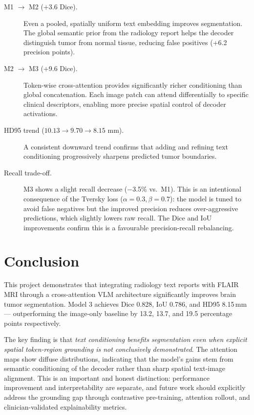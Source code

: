 \documentclass[12pt,a4paper]{article}
\begin{document}
\begin{description}
  \item[M1 $\to$ M2 ($+$3.6 Dice).]
    Even a pooled, spatially uniform text embedding improves segmentation.
    The global semantic prior from the radiology report helps the decoder
    distinguish tumor from normal tissue, reducing false positives (+6.2
    precision points).

  \item[M2 $\to$ M3 ($+$9.6 Dice).]
    Token-wise cross-attention provides significantly richer conditioning
    than global concatenation. Each image patch can attend differentially
    to specific clinical descriptors, enabling more precise spatial control
    of decoder activations.

  \item[HD95 trend ($10.13 \to 9.70 \to 8.15$ mm).]
    A consistent downward trend confirms that adding and refining text
    conditioning progressively sharpens predicted tumor boundaries.

  \item[Recall trade-off.]
    M3 shows a slight recall decrease ($-$3.5\% vs.\ M1).
    This is an intentional consequence of the Tversky loss
    ($\alpha=0.3, \beta=0.7$): the model is tuned to avoid false negatives
    but the improved precision reduces over-aggressive predictions,
    which slightly lowers raw recall. The Dice and IoU improvements
    confirm this is a favourable precision-recall rebalancing.
\end{description}

\section{Conclusion}
This project demonstrates that integrating radiology text reports with FLAIR
MRI through a cross-attention VLM architecture significantly improves brain
tumor segmentation. Model 3 achieves Dice 0.828, IoU 0.786, and HD95 8.15\,mm —
outperforming the image-only baseline by 13.2, 13.7, and 19.5 percentage points
respectively.

The key finding is that \textit{text conditioning benefits segmentation even
when explicit spatial token-region grounding is not conclusively demonstrated}.
The attention maps show diffuse distributions, indicating that the model's gains
stem from semantic conditioning of the decoder rather than sharp spatial
text-image alignment. This is an important and honest distinction: performance
improvement and interpretability are separate, and future work should
explicitly address the grounding gap through contrastive pre-training,
attention rollout, and clinician-validated explainability metrics.

\end{document}
